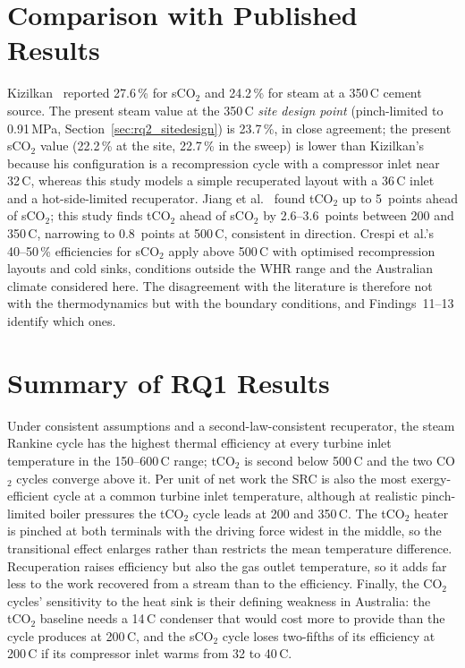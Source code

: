 \documentclass[12pt,a4paper]{report}
\begin{document}
\section{Comparison with Published Results}
\label{sec:lit_comparison}

Kizilkan~\cite{Kizilkan2020} reported 27.6\,\% for sCO$_2$ and 24.2\,\% for
steam at a 350\,\textdegree C cement source. The present steam value at the
350\,\textdegree C \emph{site design point} (pinch-limited to 0.91\,MPa,
Section~\ref{sec:rq2_sitedesign}) is 23.7\,\%, in close agreement; the
present sCO$_2$ value (22.2\,\% at the site, 22.7\,\% in the sweep) is lower
than Kizilkan's because his configuration is a recompression cycle with a
compressor inlet near 32\,\textdegree C, whereas this study models a simple
recuperated layout with a 36\,\textdegree C inlet and a hot-side-limited
recuperator. Jiang et al.~\cite{Jiang2023} found tCO$_2$ up to 5~points
ahead of sCO$_2$; this study finds tCO$_2$ ahead of sCO$_2$ by 2.6--3.6~points
between 200 and 350\,\textdegree C, narrowing to 0.8~points at
500\,\textdegree C, consistent in direction. Crespi et al.'s~\cite{Crespi2017}
40--50\,\% efficiencies for sCO$_2$ apply above 500\,\textdegree C with
optimised recompression layouts and cold sinks, conditions outside the WHR
range and the Australian climate considered here. The disagreement with the
literature is therefore not with the thermodynamics but with the boundary
conditions, and Findings~11--13 identify which ones.

\section{Summary of RQ1 Results}
\label{sec:rq1_summary}

Under consistent assumptions and a second-law-consistent recuperator, the
steam Rankine cycle has the highest thermal efficiency at every turbine inlet
temperature in the 150--600\,\textdegree C range; tCO$_2$ is second below
500\,\textdegree C and the two CO$_2$ cycles converge above it. Per unit of
net work the SRC is also the most exergy-efficient cycle at a common turbine
inlet temperature, although at realistic pinch-limited boiler pressures the
tCO$_2$ cycle leads at 200 and 350\,\textdegree C. The tCO$_2$ heater is
pinched at both terminals with the driving force widest in the middle, so
the transitional effect enlarges rather than restricts the mean temperature
difference. Recuperation raises efficiency but also the gas outlet
temperature, so it adds far less to the work recovered from a stream than to
the efficiency. Finally, the CO$_2$ cycles' sensitivity to the heat sink is
their defining weakness in Australia: the tCO$_2$ baseline needs a
14\,\textdegree C condenser that would cost more to provide than the cycle
produces at 200\,\textdegree C, and the sCO$_2$ cycle loses two-fifths of its
efficiency at 200\,\textdegree C if its compressor inlet warms from 32 to
40\,\textdegree C.
\end{document}
